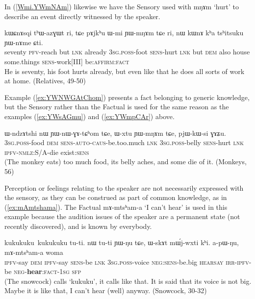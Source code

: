 \documentclass[oldfontcommands,oneside,a4paper,11pt]{article}
\newcommand{\ipa}[1]{{\phon \mbox{#1}}} %
\newcommand{\refb}[1]{(\ref{#1})}
\newcommand{\factual}[1]{\textsc{:fact}}
\begin{document}
In \refb{Wmi.YWmNAm} likewise we have the Sensory used with \ipa{mŋɤm} `hurt' to describe an event directly witnessed by the speaker.

\begin{exe}
\ex \label{Wmi.YWmNAm}
\gll
\ipa{kɯɕnɤsqi} 	\ipa{tʰɯ-azɣɯt} 	\ipa{ri,} \ipa{tɕe} 	\ipa{pɤjkʰu} 	\ipa{ɯ-mi} 	\ipa{ɲɯ-mŋɤm} 	\ipa{tɕe} 	\ipa{ri,} 	\ipa{nɯ} 	\ipa{kɯnɤ} 	\ipa{kʰa} 	\ipa{tsʰitsuku} 	\ipa{ɲɯ-nɤme} 	\ipa{ɕti.} \\
seventy \textsc{pfv}-reach but \textsc{lnk} already \textsc{3sg.poss}-foot \textsc{sens}-hurt \textsc{lnk} but \textsc{dem} also house some.things \textsc{sens}-work[III] be:\textsc{affirm}\factual{} \\
\glt He is seventy, his foot hurts already, but even like that he does all sorts of work at home. (Relatives, 49-50)
\end{exe}

Example \refb{ex:YWNWGAtChom} presents a fact belonging to generic knowledge, but the Sensory rather than the Factual is used for the same reason as the examples \refb{ex:YWsAGmu} and \refb{ex:YWmpCAr} above.

\begin{exe}
\ex \label{ex:YWNWGAtChom}
\gll
\ipa{ɯ-ndzɤtshi}  	\ipa{nɯ}  	\ipa{ɲɯ-nɯ-ɣɤ-tɕʰom}  	\ipa{tɕe,}  	\ipa{ɯ-xtu}  	\ipa{ɲɯ-mŋɤm}  	\ipa{tɕe,}  	\ipa{pjɯ-kɯ-si}  	\ipa{ɣɤʑu.}  \\
\textsc{3sg.poss}-food \textsc{dem} \textsc{sens-auto-caus}-be.too.much \textsc{lnk} \textsc{3sg.poss}-belly \textsc{sens}-hurt \textsc{lnk} \textsc{ipfv-nmlz}:S/A-die exist:\textsc{sens} \\
\glt (The monkey eats) too much food, its belly aches, and some die of it. (Monkeys, 56)
\end{exe}
  
Perception or feelings relating to the speaker are not necessarily expressed with the sensory, as they can be construed as part of common knowledge, as in \refb{ex:mAmtshama}. The Factual  \ipa{mɤ-mtsʰam-a} `I can't hear' is used in this example because the audition issues of the speaker are a permanent state (not recently discovered), and is known by everybody.

\begin{exe}
\ex \label{ex:mAmtshama}
\gll
\ipa{kukukuku kukukuku} 	\ipa{tu-ti.} 	\ipa{nɯ} 	\ipa{tu-ti} 	\ipa{ɲɯ-ŋu} 	\ipa{tɕe,} 	\ipa{ɯ-skɤt} 	\ipa{mɯ́j-wxti} 	\ipa{kʰi.} 	\ipa{a-pɯ-ŋu,} \ipa{mɤ-mtsʰam-a} 	\ipa{woma} \\
{ } \textsc{ipfv}-say \textsc{dem}  \textsc{ipfv}-say \textsc{sens}-be \textsc{lnk}  \textsc{3sg.poss}-voice \textsc{neg:sens}-be.big \textsc{hearsay} \textsc{irr-ipfv}-be \textsc{neg}-\textbf{hear}:\textsc{fact-1sg} \textsc{sfp} \\
\glt (The snowcock) calls `kukuku', it calls like that. It is said that its voice is not big. Maybe it is like that, I can't hear (well) anyway. (Snowcock, 30-32)
\end{exe}
\end{document}
